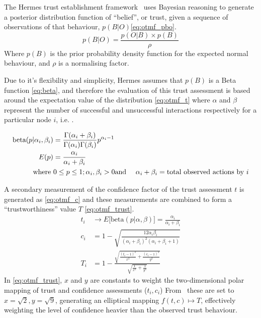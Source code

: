 The Hermes trust establishment framework~\cite{Zouridaki2005} uses Bayesian reasoning to generate a posterior distribution function of ``belief'', or trust, given a sequence of observations of that behaviour, $p(B|O)$\eqref{eq:otmf_pbo}.
%
\begin{equation}
  p(B|O)  = \frac{p(O|B) \times p(B)}{\rho}
  \label{eq:otmf_pbo}
\end{equation}
%
Where $p(B)$ is the prior probability density function for the expected normal behaviour, and $\rho$ is a normalising factor.

Due to it's flexibility and simplicity, Hermes assumes that $p(B)$ is a Beta function \eqref{eq:beta}, and therefore the evaluation of this trust assessment is based around the expectation value of the distribution \eqref{eq:otmf_t}  where $\alpha$ and $\beta$ represent the number of successful and unsuccessful interactions respectively for a particular node $i$, i.e. .

\begin{align}
  \label{eq:beta}
  \text{beta}(p|\alpha_i,\beta_i) &= \frac{\Gamma(\alpha_i + \beta_i)}{\Gamma(\alpha_i)\Gamma(\beta_i)}p^{\alpha_i-1}\\
  \label{eq:beta_e}
  E(p) &= \frac{\alpha_i}{\alpha_i + \beta_i}\\
  \text{where } &0 \leq p \leq 1; \alpha_i,\beta_i > 0 \notag
  \text{and }& \alpha_i + \beta_i = \text{total observed actions by $i$} \notag
\end{align}
%

A secondary measurement of the confidence factor of the trust assessment $t$ is generated as \eqref{eq:otmf_c} and these measurements are combined to form a ``trustworthiness'' value $T$ \eqref{eq:otmf_trust}.
%
\begin{align}
  t_i &\to E\lbrack\text{beta}(p|\alpha,\beta)\rbrack = \frac{\alpha_i}{\alpha_i+\beta_i} \label{eq:otmf_t}\\[5pt]
  c_i &= 1 - \sqrt{\frac{12\alpha_i\beta_i}{(\alpha_i+\beta_i)^2(\alpha_i+\beta_i+1)}} \label{eq:otmf_c}\\[5pt]
  T_i &= 1 - \frac{\sqrt{\frac{(t_i-1)^2}{x^2} + \frac{(c_i-1)^2}{y^2}}}{\sqrt{\frac{1}{x^2}+\frac{1}{y^2}}} \label{eq:otmf_trust}
\end{align}
%
In \eqref{eq:otmf_trust}, $x$ and $y$ are constants to weight the two-dimensional polar mapping of trust and confidence assessments ($t_i,c_i$)
From~\citet{Zouridaki2005} these are set to $x=\sqrt{2},y=\sqrt{9}$, generating an elliptical mapping $f(t,c) \mapsto T$, effectively weighting the level of confidence heavier than the observed trust behaviour.

